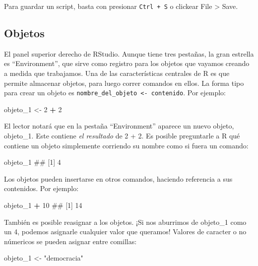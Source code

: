 \documentclass[]{book}
\newenvironment{Shaded}{\begin{snugshade}}{\end{snugshade}}
\newcommand{\DecValTok}[1]{\textcolor[rgb]{0.00,0.00,0.81}{#1}}
\newcommand{\StringTok}[1]{\textcolor[rgb]{0.31,0.60,0.02}{#1}}
\newcommand{\OperatorTok}[1]{\textcolor[rgb]{0.81,0.36,0.00}{\textbf{#1}}}
\newcommand{\NormalTok}[1]{#1}
\begin{document}
Para guardar un script, basta con presionar \texttt{Ctrl\ +\ S} o
clickear File \textgreater{} Save.

\subsection{Objetos}\label{objetos}

El panel superior derecho de RStudio. Aunque tiene tres pestañas, la
gran estrella es ``Environment'', que sirve como registro para los
objetos que vayamos creando a medida que trabajamos. Una de las
características centrales de R es que permite almacenar objetos, para
luego correr comandos en ellos. La forma tipo para crear un objeto es
\texttt{nombre\_del\_objeto\ \textless{}-\ contenido}. Por ejemplo:

\begin{Shaded}
\begin{Highlighting}[]
\NormalTok{objeto_}\DecValTok{1}\NormalTok{ <-}\StringTok{ }\DecValTok{2} \OperatorTok{+}\StringTok{ }\DecValTok{2}
\end{Highlighting}
\end{Shaded}

El lector notará que en la pestaña ``Environment'' aparece un nuevo
objeto, objeto\_1. Este contiene \emph{el resultado} de 2 + 2. Es
posible preguntarle a R qué contiene un objeto simplemente corriendo su
nombre como si fuera un comando:

\begin{Shaded}
\begin{Highlighting}[]
\NormalTok{objeto_}\DecValTok{1}
\NormalTok{## [1] 4}
\end{Highlighting}
\end{Shaded}

Los objetos pueden insertarse en otros comandos, haciendo referencia a
sus contenidos. Por ejemplo:

\begin{Shaded}
\begin{Highlighting}[]
\NormalTok{objeto_}\DecValTok{1} \OperatorTok{+}\StringTok{ }\DecValTok{10}
\NormalTok{## [1] 14}
\end{Highlighting}
\end{Shaded}

También es posible reasignar a los objetos. ¡Si nos aburrimos de
objeto\_1 como un 4, podemos asignarle cualquier valor que queramos!
Valores de caracter o no númericos se pueden asignar entre comillas:

\begin{Shaded}
\begin{Highlighting}[]
\NormalTok{objeto_}\DecValTok{1}\NormalTok{ <-}\StringTok{ "democracia"}
\end{Highlighting}
\end{Shaded}
\end{document}
